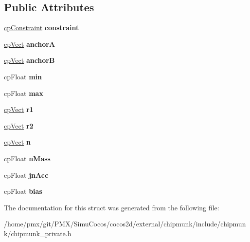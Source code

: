 \subsection*{Public Attributes}
\begin{DoxyCompactItemize}
\item 
\mbox{\label{structcpSlideJoint_ac176118fb1e3c608502e2c38b681299b}} 
\hyperlink{structcpConstraint}{cp\+Constraint} {\bfseries constraint}
\item 
\mbox{\label{structcpSlideJoint_ab4a47facc1b3b5159556acdb49da1f0c}} 
\hyperlink{structcpVect}{cp\+Vect} {\bfseries anchorA}
\item 
\mbox{\label{structcpSlideJoint_a3b2651bb23758311d692f4c8723967bb}} 
\hyperlink{structcpVect}{cp\+Vect} {\bfseries anchorB}
\item 
\mbox{\label{structcpSlideJoint_ab09e70408e21a6ec3876ec0bb8e0df3d}} 
cp\+Float {\bfseries min}
\item 
\mbox{\label{structcpSlideJoint_a64e7a5318a380a89e4b2d4f415149a3e}} 
cp\+Float {\bfseries max}
\item 
\mbox{\label{structcpSlideJoint_a0e9f6d561515fce715ed9e9b47a6ac18}} 
\hyperlink{structcpVect}{cp\+Vect} {\bfseries r1}
\item 
\mbox{\label{structcpSlideJoint_a4ba25b2cbb8665e28aa2198df8b53f84}} 
\hyperlink{structcpVect}{cp\+Vect} {\bfseries r2}
\item 
\mbox{\label{structcpSlideJoint_a984ebef2e99ef0e1e4bdb2d0b7aa3d50}} 
\hyperlink{structcpVect}{cp\+Vect} {\bfseries n}
\item 
\mbox{\label{structcpSlideJoint_afc1d5423a8637a8b101e713d91b218e3}} 
cp\+Float {\bfseries n\+Mass}
\item 
\mbox{\label{structcpSlideJoint_a2722beb353431b561c8fa9431750cc4e}} 
cp\+Float {\bfseries jn\+Acc}
\item 
\mbox{\label{structcpSlideJoint_a799773608a020dcd87eb6b00d7058a00}} 
cp\+Float {\bfseries bias}
\end{DoxyCompactItemize}


The documentation for this struct was generated from the following file\+:\begin{DoxyCompactItemize}
\item 
/home/pmx/git/\+P\+M\+X/\+Simu\+Cocos/cocos2d/external/chipmunk/include/chipmunk/chipmunk\+\_\+private.\+h\end{DoxyCompactItemize}
